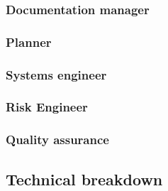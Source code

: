 \subsubsection{Documentation manager}\label{subsec:D_and_A}


\subsubsection{Planner}\label{subsec:Planner}


\subsubsection{Systems engineer}\label{subsec:SE}


\subsubsection{Risk Engineer}\label{subsec:RiskEng}


\subsubsection{Quality assurance}\label{subsec:QA}



\subsection{Technical breakdown}
